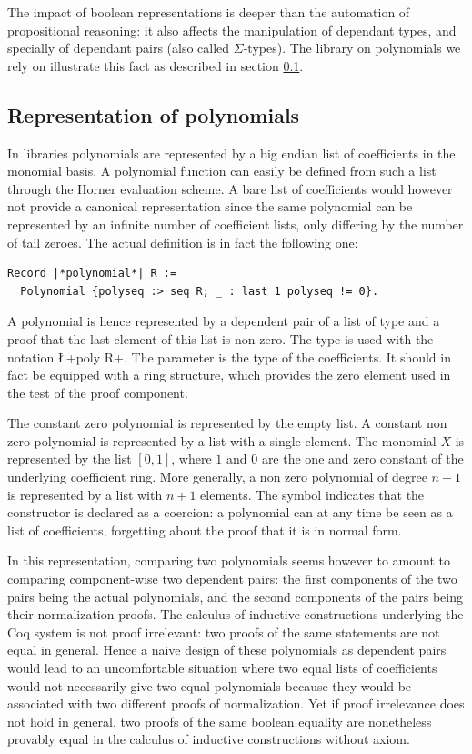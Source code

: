 \documentclass{mscs}
\begin{document}
The impact of boolean representations is deeper than the automation of
propositional reasoning: it also affects the manipulation of dependant
types, and specially of dependant pairs (also called
$\Sigma$-types). The \ssr{} library on polynomials we rely on
illustrate this fact as described in section \ref{ssec:polys}.

\subsection{Representation of polynomials}\label{ssec:polys}
In \ssr{} libraries 
polynomials are represented by a big endian list of coefficients in
the monomial basis. A polynomial function can easily be defined from
such a list through the Horner evaluation scheme.
A bare list of coefficients would however not
provide a canonical representation since the same
polynomial can be represented by an infinite number of coefficient
lists, only differing by the number of tail zeroes. The actual
definition is in fact the following one:
\begin{lstlisting}
Record |*polynomial*| R :=
  Polynomial {polyseq :> seq R; _ : last 1 polyseq != 0}.
\end{lstlisting}
A polynomial is hence
represented by a dependent pair of a list  of type  and a
proof that the last element of this list is non zero. The type
 is used with the notation \L+{poly R}+. The
parameter  is the type of the coefficients. It should in fact
be equipped with a ring structure, which provides the zero element
used in the test of the proof component.

The constant zero polynomial is represented by the empty list. A
constant non zero polynomial is represented by a list with a single
element. The monomial $X$ is represented
by the list $[0, 1]$, where $1$ and $0$ are the one and zero
constant of the underlying coefficient ring.
More generally, a non zero polynomial of degree $n+1$ is
represented by a list with $n+1$ elements. The \C{:>} symbol indicates
that the  constructor is declared as a coercion: a
polynomial can at any time be seen as a list of coefficients,
forgetting about the proof that it is in normal form.

In this representation, comparing two polynomials seems however to
amount to comparing component-wise two dependent pairs: the first
components of
the two pairs being the actual polynomials, and the second components
of the pairs being their normalization proofs.  The calculus of
inductive constructions underlying the Coq system is not proof
irrelevant: two proofs of the same statements are not equal in
general. Hence a naive design of these polynomials as dependent pairs
would lead to an uncomfortable situation where two equal lists of
coefficients would not necessarily give two equal polynomials because
they would be associated with two different proofs of normalization. Yet if
proof irrelevance does not hold in general, two proofs of the same
boolean equality are nonetheless provably equal in the calculus of
inductive constructions without axiom.
\end{document}
